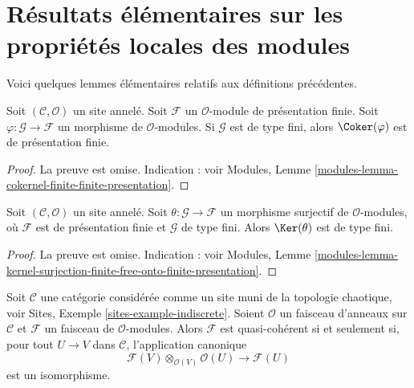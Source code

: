\section{Résultats élémentaires sur les propriétés locales des modules}
\label{section-basics}

\noindent
Voici quelques lemmes élémentaires relatifs aux définitions précédentes.

\begin{lemma}
\label{lemma-cokernel-finite-finite-presentation}
Soit $(\mathcal{C},\mathcal{O})$ un site annelé. Soit $\mathcal{F}$ un
$\mathcal{O}$-module de présentation finie. Soit
$\varphi : \mathcal{G} \to \mathcal{F}$ un morphisme de
$\mathcal{O}$-modules. Si $\mathcal{G}$ est de type fini, alors
$\Coker(\varphi)$ est de présentation finie.
\end{lemma}

\begin{proof}
La preuve est omise. Indication : voir Modules, Lemme
\ref{modules-lemma-cokernel-finite-finite-presentation}.
\end{proof}

\begin{lemma}
\label{lemma-kernel-surjection-finite-onto-finite-presentation}
Soit $(\mathcal{C}, \mathcal{O})$ un site annelé.
Soit $\theta : \mathcal{G} \to \mathcal{F}$ un morphisme surjectif de
$\mathcal{O}$-modules, où $\mathcal{F}$ est de présentation finie et
$\mathcal{G}$ de type fini. Alors $\Ker(\theta)$ est de type fini.
\end{lemma}

\begin{proof}
La preuve est omise. Indication : voir Modules, Lemme
\ref{modules-lemma-kernel-surjection-finite-free-onto-finite-presentation}.
\end{proof}

\begin{lemma}
\label{lemma-chaotic-quasi-coherent}
Soit $\mathcal{C}$ une catégorie considérée comme un site muni de la
topologie chaotique, voir Sites, Exemple \ref{sites-example-indiscrete}.
Soient $\mathcal{O}$ un faisceau d'anneaux sur $\mathcal{C}$ et
$\mathcal{F}$ un faisceau de $\mathcal{O}$-modules. Alors $\mathcal{F}$ est
quasi-cohérent si et seulement si, pour tout $U \to V$ dans $\mathcal{C}$,
l'application canonique
$$
\mathcal{F}(V) \otimes_{\mathcal{O}(V)} \mathcal{O}(U)
\longrightarrow
\mathcal{F}(U)
$$
est un isomorphisme.
\end{lemma}


